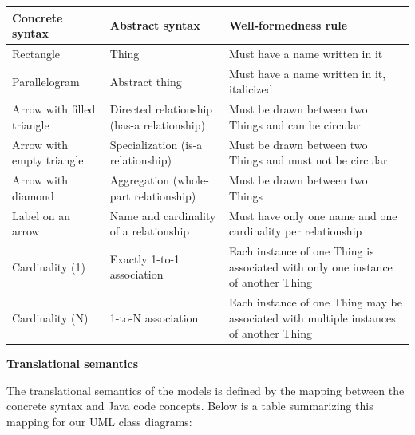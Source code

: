 \begin{table}[h]
    \centering
    \begin{tabular}{|p{4cm}|p{4cm}|p{7cm}|}
    \hline
    \textbf{Concrete syntax} & \textbf{Abstract syntax} & \textbf{Well-formedness rule} \\
    \hline
    
    Rectangle & Thing & Must have a name written in it \\
    \hline
    
    Parallelogram & Abstract thing & Must have a name written in it, italicized \\
    \hline
    
    Arrow with filled triangle & Directed relationship (has-a relationship) & Must be drawn between two Things and can be circular \\
    \hline
    
    Arrow with empty triangle & Specialization (is-a relationship) & Must be drawn between two Things and must not be circular \\
    \hline
    
    Arrow with diamond & Aggregation (whole-part relationship) & Must be drawn between two Things \\
    \hline
    
    Label on an arrow & Name and cardinality of a relationship & Must have only one name and one cardinality per relationship \\
    \hline
    
    Cardinality (1) & Exactly 1-to-1 association & Each instance of one Thing is associated with only one instance of another Thing \\
    \hline
    
    Cardinality (N) & 1-to-N association & Each instance of one Thing may be associated with multiple instances of another Thing \\
    \hline
    
    \end{tabular}
\end{table}   


\textbf{Translational semantics}

The translational semantics of the models is defined by the mapping between the concrete syntax and Java code concepts. Below is a table summarizing this mapping for our UML class diagrams:

